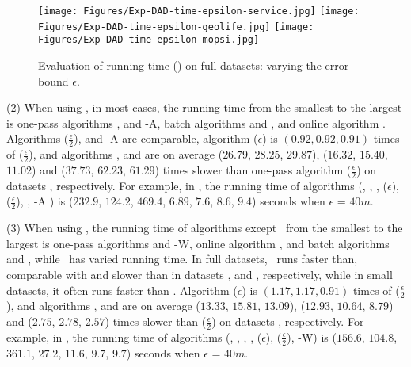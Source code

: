 {	\begin{figure*}[tb!]
		\centering
		\texttt{[image: Figures/Exp-DAD-time-epsilon-service.jpg]} 	\hspace{0.5ex}
		\texttt{[image: Figures/Exp-DAD-time-epsilon-geolife.jpg]}	\hspace{0.5ex}
		\texttt{[image: Figures/Exp-DAD-time-epsilon-mopsi.jpg]}		
		\vspace{-2ex}
		\caption{\small Evaluation of running time (\dad) on full datasets: varying the error bound $\epsilon$.}\label{fig:time-epsilon-dad}
		\vspace{-2ex}
	\end{figure*}

\sstab (2) When using \ped, in most cases, the running time from the smallest to the largest is one-pass algorithms \siped, \operb and {\operb-A}, batch algorithms \tpa and \dpa, and online algorithm \bqsa.
Algorithms \siped($\frac{\epsilon}{2}$), {\operb} and {\operb-A} are comparable, algorithm \siped(${\epsilon}$) is $(0.92, 0.92, 0.91)$ times of \siped($\frac{\epsilon}{2}$), and algorithms \tpa, \dpa and \bqsa are on average
($26.79$, $28.25$, $29.87$), ($16.32$, $15.40$, $11.02$) and ($37.73$, $62.23$, $61.29$)
times slower than one-pass algorithm \siped($\frac{\epsilon}{2}$) on datasets \dSets, respectively.
For example, in \mopsi, the running time of algorithms
(\tpa, \dpa, \bqsa, \siped(${\epsilon}$), \siped($\frac{\epsilon}{2}$), \operb, {\operb-A} ) is ($232.9$, $124.2$, $469.4$, $6.89$, $7.6$, $8.6$, {$9.4$}) seconds when $\epsilon$ = $40m$.





\sstab (3) When using \sed, the running time of algorithms except \dagots~from the smallest to the largest is one-pass algorithms \cised and {\cised-W}, online algorithm \squishe, and batch algorithms \tpa and \dpa, while \dagots~has varied running time. In full datasets, \dagots~runs faster than, comparable with and slower than \dpa in datasets \ucar, \geolife and \mopsi, respectively, while in small datasets, it often runs faster than \dpa.
Algorithm \cised(${\epsilon}$) is $(1.17, 1.17, 0.91)$ times of \cised($\frac{\epsilon}{2}$), and algorithms \tpa, \dpa and \squishe are on average
 ($13.33$, $15.81$, $13.09$), ($12.93$, $10.64$, $8.79$) and
($2.75$, $2.78$, $2.57$) times slower than \cised($\frac{\epsilon}{2}$) on datasets \dSets, respectively.
%
For example, in \mopsi, the running time of algorithms
(\tpa, \dpa, {\dagots}, \squishe, \cised($\epsilon$), \cised($\frac{\epsilon}{2}$), {\cised-W}) is ($156.6$, $104.8$, {$361.1$}, $27.2$, $11.6$, $9.7$, {$9.7$}) seconds when $\epsilon$ = $40m$.

}
